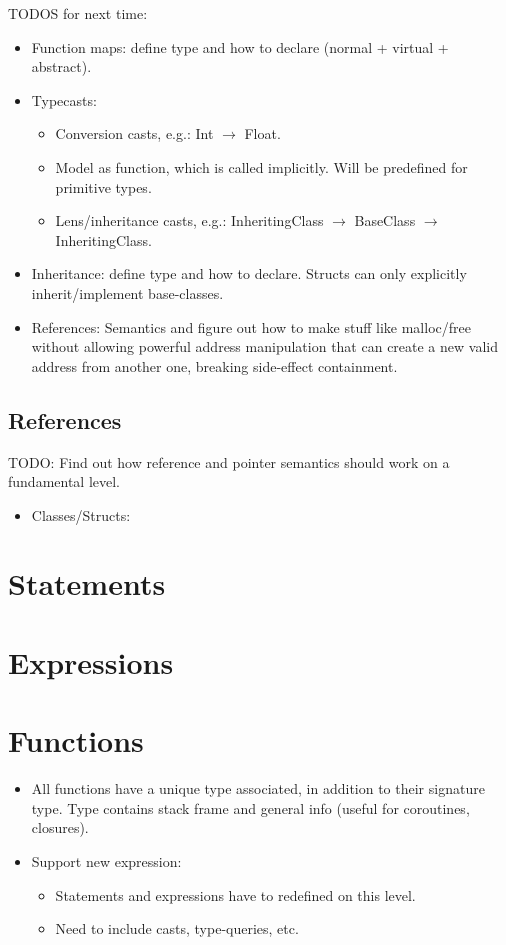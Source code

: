 TODOS for next time:
\begin{itemize}
	\item Function maps: define type and how to declare (normal + virtual + abstract).
	\item Typecasts:
		\begin{itemize}
			\item Conversion casts, e.g.: Int $\to$ Float.
			\item Model as function, which is called implicitly. Will be predefined for primitive types.
			\item Lens/inheritance casts, e.g.: InheritingClass $\to$ BaseClass $\to$ InheritingClass.
		\end{itemize}
	\item Inheritance: define type and how to declare.
		Structs can only explicitly inherit/implement base-classes.
	\item References: Semantics and figure out how to make stuff like malloc/free without allowing powerful address manipulation that can create a new valid address from another one, breaking side-effect containment.
\end{itemize}

\subsection{References}
TODO: Find out how reference and pointer semantics should work on a fundamental level.

\begin{itemize}
	\item Classes/Structs:
	\begin{itemize}
	\end{itemize}
\end{itemize}

\section{Statements}

\section{Expressions}

\section{Functions}
\begin{itemize}
	\item All functions have a unique type associated, in addition to their signature type.
		Type contains stack frame and general info (useful for coroutines, closures).
	\item Support new expression:
		\begin{itemize}
			\item Statements and expressions have to redefined on this level.
			\item Need to include casts, type-queries, etc.
		\end{itemize}
\end{itemize}

